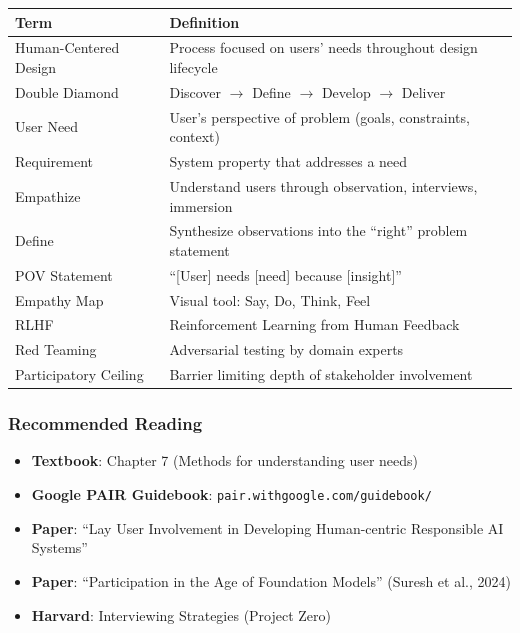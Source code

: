 \begin{center}
\renewcommand{\arraystretch}{1.3}
\begin{tabular}{@{} l p{8cm} @{}}
\toprule
\textbf{Term} & \textbf{Definition} \\
\midrule
Human-Centered Design & Process focused on users' needs throughout design lifecycle \\
Double Diamond & Discover $\to$ Define $\to$ Develop $\to$ Deliver \\
User Need & User's perspective of problem (goals, constraints, context) \\
Requirement & System property that addresses a need \\
Empathize & Understand users through observation, interviews, immersion \\
Define & Synthesize observations into the ``right'' problem statement \\
POV Statement & ``[User] needs [need] because [insight]'' \\
Empathy Map & Visual tool: Say, Do, Think, Feel \\
RLHF & Reinforcement Learning from Human Feedback \\
Red Teaming & Adversarial testing by domain experts \\
Participatory Ceiling & Barrier limiting depth of stakeholder involvement \\
\bottomrule
\end{tabular}
\end{center}

\subsubsection*{Recommended Reading}
\begin{itemize}
  \item \textbf{Textbook}: Chapter 7 (Methods for understanding user needs)
  \item \textbf{Google PAIR Guidebook}: \texttt{pair.withgoogle.com/guidebook/}
  \item \textbf{Paper}: ``Lay User Involvement in Developing Human-centric Responsible AI Systems''
  \item \textbf{Paper}: ``Participation in the Age of Foundation Models'' (Suresh et al., 2024)
  \item \textbf{Harvard}: Interviewing Strategies (Project Zero)
\end{itemize}


